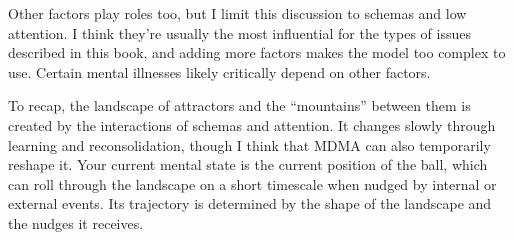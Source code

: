 \documentclass[11pt,oneside]{book}
\begin{document}
Other factors play roles too, but I limit this discussion to schemas and low attention. I think they're usually the most influential for the types of issues described in this book, and adding more factors makes the model too complex to use. Certain mental illnesses likely critically depend on other factors.

To recap, the landscape of attractors and the \enquote{mountains} between them is created by the interactions of schemas and attention. It changes slowly through learning and reconsolidation, though I think that MDMA can also temporarily reshape it. Your current mental state is the current position of the ball, which can roll through the landscape on a short timescale when nudged by internal or external events. Its trajectory is determined by the shape of the landscape and the nudges it receives.
\end{document}
